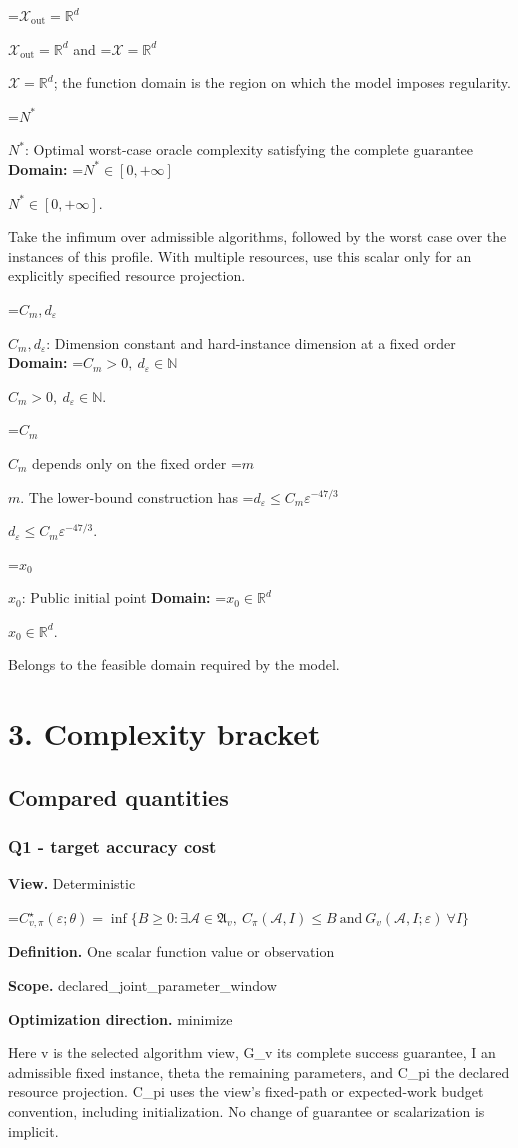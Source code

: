\documentclass[10pt,a4paper]{article}
\newcommand{\AtlasMath}[1]{\par\begingroup\centering\setbox0=\hbox{$\displaystyle #1$}\ifdim\wd0>1.4\linewidth\typeout{ATLAS WIDE FORMULA: \the\wd0}\fi\ifdim\wd0>\linewidth\resizebox{\linewidth}{!}{\box0}\else\box0\fi\par\endgroup}
\newcommand{\AtlasInlineMath}[1]{\begingroup\setbox0=\hbox{$#1$}\ifdim\wd0>.4\linewidth\endgroup\AtlasMath{#1}\else\endgroup$#1$\fi}
\begin{document}
\AtlasInlineMath{\mathcal{X}_{\mathrm{out}}=\mathbb{R}^d} and \AtlasInlineMath{\mathcal{X}=\mathbb{R}^d}; the function domain is the region on which the model imposes regularity.

\AtlasInlineMath{N^*}: Optimal worst-case oracle complexity satisfying the complete guarantee \textbf{Domain:} \AtlasInlineMath{N^*\in[0,+\infty]}.

Take the infimum over admissible algorithms, followed by the worst case over the instances of this profile. With multiple resources, use this scalar only for an explicitly specified resource projection.

\AtlasInlineMath{C_m,d_\varepsilon}: Dimension constant and hard-instance dimension at a fixed order \textbf{Domain:} \AtlasInlineMath{C_m>0,\ d_\varepsilon\in\mathbb{N}}.

\AtlasInlineMath{C_m} depends only on the fixed order \AtlasInlineMath{m}. The lower-bound construction has \AtlasInlineMath{d_\varepsilon\le C_m\varepsilon^{-47/3}}.

\AtlasInlineMath{x_0}: Public initial point \textbf{Domain:} \AtlasInlineMath{x_0\in\mathbb{R}^d}.

Belongs to the feasible domain required by the model.

\section{3. Complexity bracket}
\subsection{Compared quantities}
\subsubsection{Q1 - target accuracy cost}
\textbf{View.} Deterministic

\AtlasMath{C^\star_{v,\pi}(\varepsilon;\theta)=\inf\{B\ge0:\exists\mathcal A\in\mathfrak A_v,\ C_\pi(\mathcal A,I)\le B\ \text{and}\ G_v(\mathcal A,I;\varepsilon)\ \forall I\}}
\textbf{Definition.} One scalar function value or observation

\textbf{Scope.} declared\_joint\_parameter\_window

\textbf{Optimization direction.} minimize

Here v is the selected algorithm view, G\_v its complete success guarantee, I an admissible fixed instance, theta the remaining parameters, and C\_pi the declared resource projection. C\_pi uses the view's fixed-path or expected-work budget convention, including initialization. No change of guarantee or scalarization is implicit.
\end{document}
